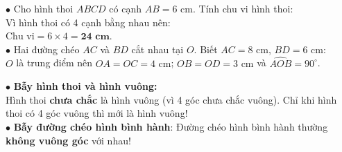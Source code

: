 \documentclass[14pt,a4paper,oneside]{extbook}
\begin{document}
\vspace{2mm}

\noindent
\begin{minipage}[t]{0.53\textwidth}
  \begin{tcolorbox}[
    enhanced,
    title={\footnotesize\bfseries\color{white}\faCheckCircle\ Ví dụ thực hành chuẩn mực},
    colback=green!2!white,
    colframe=green!60!black,
    arc=2.5mm, boxrule=0.8pt, top=1.8mm, bottom=1.8mm, left=2.2mm, right=2.2mm
  ]
    \footnotesize
    $\bullet$ Cho hình thoi $ABCD$ có cạnh $AB = 6\text{ cm}$. Tính chu vi hình thoi:\\
    Vì hình thoi có 4 cạnh bằng nhau nên:\\
    $\text{Chu vi} = 6 \times 4 = \mathbf{24\text{ cm}}$.\\[1mm]
    $\bullet$ Hai đường chéo $AC$ và $BD$ cắt nhau tại $O$. Biết $AC = 8\text{ cm}$, $BD = 6\text{ cm}$:\\
    $O$ là trung điểm nên $OA = OC = 4\text{ cm}$; $OB = OD = 3\text{ cm}$ và $\widehat{AOB} = 90^\circ$.
  \end{tcolorbox}
\end{minipage}%
\hfill
\begin{minipage}[t]{0.45\textwidth}
  \begin{tcolorbox}[
    enhanced,
    title={\footnotesize\bfseries\color{white}\faExclamationTriangle\ Mẹo tránh bẫy trắc nghiệm},
    colback=red!2!white,
    colframe=red!70!black,
    arc=2.5mm, boxrule=0.8pt, top=1.8mm, bottom=1.8mm, left=2.2mm, right=2.2mm
  ]
    \footnotesize
    $\bullet$ \textbf{Bẫy hình thoi và hình vuông:}\\
    Hình thoi \textbf{chưa chắc} là hình vuông (vì 4 góc chưa chắc vuông). Chỉ khi hình thoi có 4 góc vuông thì mới là hình vuông!\\
    $\bullet$ \textbf{Bẫy đường chéo hình bình hành}: Đường chéo hình bình hành thường \textbf{không vuông góc} với nhau!
  \end{tcolorbox}
\end{minipage}
\end{document}
